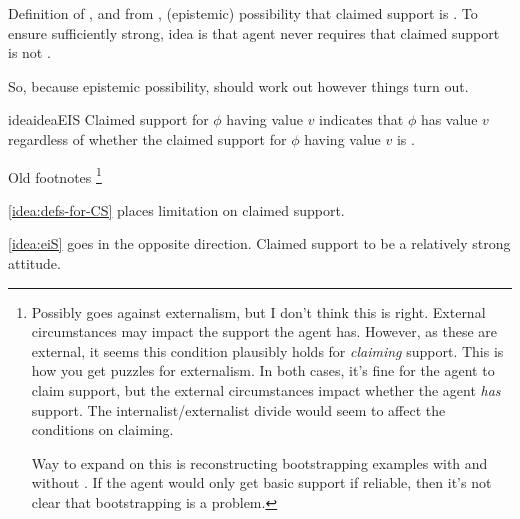 \begin{note}[\eiS{}]
  Definition of \mom{}, and from \nfcs{}, (epistemic) possibility that claimed support is \mom{}.
  To ensure sufficiently strong, idea is that agent never requires that claimed support is not \mom{}.

  So, because epistemic possibility, should work out however things turn out.



  \begin{restatable}[\eiS{-}]{idea}{ideaEIS}\label{idea:eiS}
    Claimed support for \(\phi\) having value \(v\) indicates that \(\phi\) has value \(v\) regardless of whether the claimed support for \(\phi\) having value \(v\) is \mom{}.
  \end{restatable}
  {
    \color{red}
    Old footnotes\nolinebreak
    \footnote{
      Possibly goes against externalism, but I don't think this is right.
      External circumstances may impact the support the agent has.
      However, as these are external, it seems this condition plausibly holds for \emph{claiming} support.
      This is how you get puzzles for externalism.
      In both cases, it's fine for the agent to claim support, but the external circumstances impact whether the agent \emph{has} support.
      The internalist/externalist divide would seem to affect the conditions on claiming.

      Way to expand on this is reconstructing bootstrapping examples with and without \eiS{}.
      If the agent would only get basic support if reliable, then it's not clear that bootstrapping is a problem.
    }
  }

  \begin{note}
    \autoref{idea:defs-for-CS} places limitation on claimed support.

    \autoref{idea:eiS} goes in the opposite direction.
    Claimed support to be a relatively strong attitude.
  \end{note}
\end{note}

